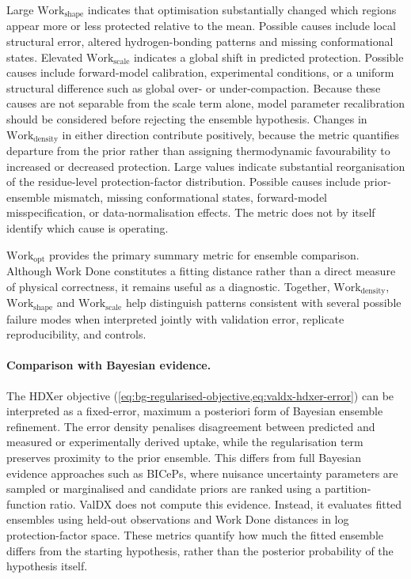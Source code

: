 Large $\text{Work}_\text{shape}$ indicates that optimisation substantially changed which regions appear more or less protected relative to the mean. Possible causes include local structural error, altered hydrogen-bonding patterns and missing conformational states. Elevated $\text{Work}_\text{scale}$ indicates a global shift in predicted protection. Possible causes include forward-model calibration, experimental conditions, or a uniform structural difference such as global over- or under-compaction. Because these causes are not separable from the scale term alone, model parameter recalibration should be considered before rejecting the ensemble hypothesis. Changes in $\text{Work}_\text{density}$ in either direction contribute positively, because the metric quantifies departure from the prior rather than assigning thermodynamic favourability to increased or decreased protection. Large values indicate substantial reorganisation of the residue-level protection-factor distribution. Possible causes include prior-ensemble mismatch, missing conformational states, forward-model misspecification, or data-normalisation effects. The metric does not by itself identify which cause is operating.

$\text{Work}_\text{opt}$ provides the primary summary metric for ensemble comparison. Although Work Done constitutes a fitting distance rather than a direct measure of physical correctness, it remains useful as a diagnostic. Together, $\text{Work}_\text{density}$, $\text{Work}_\text{shape}$ and $\text{Work}_\text{scale}$ help distinguish patterns consistent with several possible failure modes when interpreted jointly with validation error, replicate reproducibility, and controls.

\paragraph{Comparison with Bayesian evidence.}
The HDXer objective (\cref{eq:bg-regularised-objective,eq:valdx-hdxer-error}) can be interpreted as a fixed-error, maximum a posteriori form of Bayesian ensemble refinement. The error density penalises disagreement between predicted and measured or experimentally derived uptake, while the regularisation term preserves proximity to the prior ensemble. This differs from full Bayesian evidence approaches such as BICePs, where nuisance uncertainty parameters are sampled or marginalised and candidate priors are ranked using a partition-function ratio.\supercite{raddiBICePsV20Software2023c} ValDX does not compute this evidence. Instead, it evaluates fitted ensembles using held-out observations and Work Done distances in log protection-factor space. These metrics quantify how much the fitted ensemble differs from the starting hypothesis, rather than the posterior probability of the hypothesis itself.


